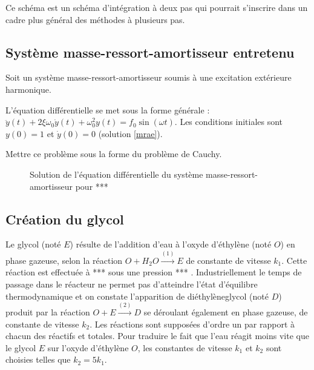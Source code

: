 \documentclass[10pt]{article}
\begin{document}
Ce schéma est un schéma d'intégration à deux pas qui pourrait s'inscrire dans un cadre plus général des méthodes à plusieurs pas.

\subsection{Système masse-ressort-amortisseur entretenu}
Soit un système masse-ressort-amortisseur soumis à une excitation extérieure harmonique.

L'équation différentielle se met sous la forme générale : $\ddot y(t) + 2\xi\omega_0 \dot y(t)+\omega_0^2 y(t) = f_0\sin(\omega t)$. Les conditions initiales sont $y(0)=1$ et $\dot y(0)=0$ (solution \ref{mrae}).

  {Mettre ce problème sous la forme du problème de Cauchy.}


\begin{figure}[!ht]


Solution de l'équation différentielle du système masse-ressort-amortisseur pour ***%
%
\end{figure}


\subsection{Création du glycol}
Le glycol (noté $E$) résulte de l'addition d'eau à l'oxyde d'éthylène (noté $O$) en phase gazeuse, selon la réaction
$O + H_2O \xrightarrow{(1)} E$ de constante de vitesse $k_1$. Cette réaction est effectuée à ***%
 sous une pression ***%
 . Industriellement le temps de passage dans le réacteur ne permet pas d'atteindre l'état d'équilibre thermodynamique
et on constate l'apparition de diéthylèneglycol (noté $D$) produit par la réaction $O+E \xrightarrow{(2)} D$ se déroulant également en phase gazeuse, de constante de vitesse $k_2$. Les réactions sont supposées d'ordre un par rapport à chacun des réactifs et totales. Pour traduire le fait que l'eau réagit moins vite que le glycol $E$ sur l'oxyde d'éthylène $O$, les constantes de vitesse $k_1$ et $k_2$ sont choisies telles que $k_2 = 5k_1$.
\end{document}
